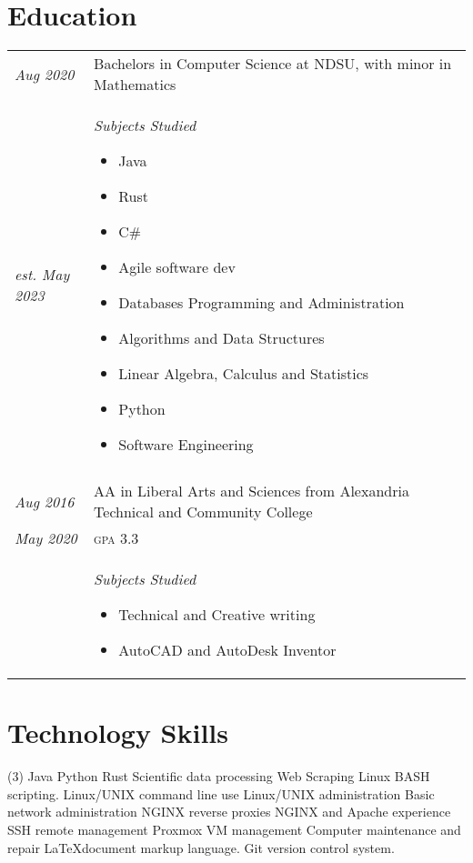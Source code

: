 \documentclass[letterpaper,10pt]{article}
\begin{document}
\section*{Education}
	\begin{tabular}{R{2cm}|p{14cm}}
	\textsl{Aug 2020} & Bachelors in Computer Science at NDSU, with minor in Mathematics\\
	\textsl{est. May 2023} & \textsl{Subjects Studied}
	\begin{itemize}[noitemsep]
		\item Java
		\item Rust
		\item C\#
		\item Agile software dev
		\item Databases Programming and Administration
		\item Algorithms and Data Structures
		\item Linear Algebra, Calculus and Statistics
		\item Python
		\item Software Engineering
	\end{itemize}\\
	\\
	\textsl{Aug 2016} & AA in Liberal Arts and Sciences from Alexandria Technical and Community College\\
	\textsl{May 2020} & \textsc{gpa} 3.3\\
	&\textsl{Subjects Studied}
	\begin{itemize}[noitemsep]
		\item Technical and Creative writing
		\item AutoCAD and AutoDesk Inventor
	\end{itemize}
	\end{tabular}
\newpage
\section*{Technology Skills}
	\begin{tasks}[style=itemize](3)
	\task Java
	\task Python
	\task Rust
	\task Scientific data processing
	\task Web Scraping
	\task Linux BASH scripting.
	\task Linux/UNIX command line use
	\task Linux/UNIX administration
	\task Basic network administration
	\task NGINX reverse proxies
	\task NGINX and Apache experience
	\task SSH remote management
	\task Proxmox VM management
	\task Computer maintenance and repair
	\task \LaTeX document markup language.
	\task Git version control system.
	\end{tasks}
\end{document}
